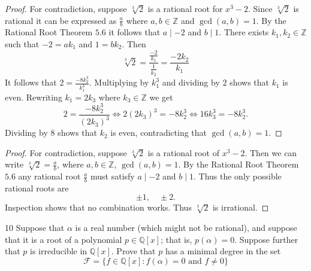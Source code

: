 \begin{proof}
    For contradiction, suppose $\sqrt[3]{2}$ is a rational root 
        for $x^3 - 2$.
    Since $\sqrt[3]{2}$ is rational it can be expressed as $\frac{a}{b}$
        where $a, b \in \mathbb{Z}$ and $\gcd(a, b) = 1$.
    By the Rational Root Theorem $5.6$
        it follows that $a \mid -2$ and $b \mid 1$.
    There exists $k_1, k_2 \in \mathbb{Z}$ such that 
        $-2 = a k_1$ and $1 = b k_2$.
    Then 
    \[\sqrt[3]{2} = \frac{\frac{-2}{k_1}}{\frac{1}{k_2}} = \frac{-2 k_2}{k_1}\]
    It follows that $2 = \frac{-8 k_2^3}{k_1^3}$. Multiplying by $k_1^3$
    and dividing by $2$ shows that $k_1$ is even.
    Rewriting $k_1 = 2 k_3$ where $k_3 \in \mathbb{Z}$  
        we get 
        \[2 = \frac{-8 k_2^3}{(2k_3)^3} 
            \iff 2 (2 k_3)^3 = -8 k_2^3
            \iff 16 k_3^3 = -8 k_2^3.\]
    Dividing by $8$ shows that $k_2$ is even, contradicting 
        that $\gcd(a, b) = 1$.
\end{proof}

\begin{proof}
    For contradiction, suppose $\sqrt[3]{2}$ is a rational root 
    of $x^3 - 2$. Then we can write $\sqrt[3]{2} = \frac{a}{b}$, 
    where $a, b \in \mathbb{Z}$, $\gcd(a, b) = 1$.  
    By the Rational Root Theorem $5.6$ any rational root $\frac{a}{b}$ 
        must satisfy $a \mid -2$ and $b \mid 1$.  
    Thus the only possible rational roots are 
    \[
        \pm 1, \quad \pm 2.
    \]  
    Inspection shows that no combination works.
    Thus  $\sqrt[3]{2}$ is irrational.
\end{proof}

\begin{problem}{10}
    Suppose that $\alpha$ is a real number (which might 
    not be rational), and suppose that it is a root of a 
    polynomial $p \in \mathbb{Q}[x]$; that is,
    $p(\alpha) = 0$. Suppose further that $p$ is irreducible
    in $\mathbb{Q}[x]$. Prove that $p$ has a minimal degree in the 
    set 
    \[\mathcal{F} = \{f \in \mathbb{Q}[x] : f(\alpha) = 0 \text{ and } f \ne 0\}\]
\end{problem}
\solved

